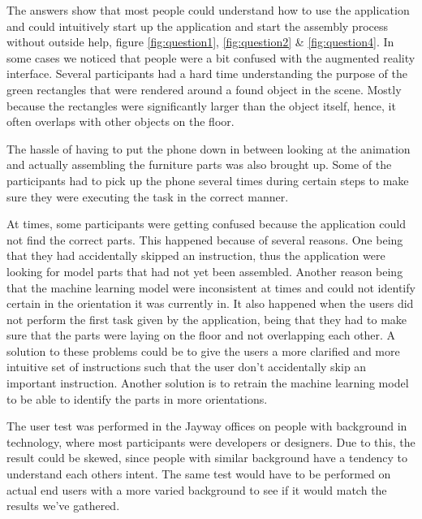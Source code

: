 The answers show that most people could understand how to use the application and 
could intuitively start up the application and start the assembly process without outside 
help, figure \ref{fig:question1}, \ref{fig:question2} \& \ref{fig:question4}. In some cases we noticed that people were a bit confused with the augmented reality 
interface. Several participants had a hard time understanding the purpose of the green 
rectangles that were rendered around a found object in the scene. Mostly because the 
rectangles were significantly larger than the object itself, hence, it often overlaps with 
other objects on the floor.

The hassle of having to put the phone down in between looking at the animation and 
actually assembling the furniture parts was also brought up. Some of the participants had 
to pick up the phone several times during certain steps to make sure they were executing 
the task in the correct manner.

At times, some participants were getting confused because the application could not find 
the correct parts. This happened because of several reasons. One being that they had 
accidentally skipped an instruction, thus the application were looking for model parts that 
had not yet been assembled. Another reason being that the machine learning model were 
inconsistent at times and could not identify certain in the orientation it was currently in. It 
also happened when the users did not perform 
the first task given by the application, being that they had to make sure that the parts were 
laying on the floor and not overlapping each other. A solution to these problems could be 
to give the users a more clarified and more intuitive set of instructions such that the user 
don't accidentally skip an important instruction. Another solution is to retrain the machine 
learning model to be able to identify the parts in more orientations. 

The user test was performed in the Jayway offices on people with background in 
technology, where most participants were developers or designers. Due to this, the result 
could be skewed, since people with similar background have a tendency to understand 
each others intent. The same test would have to be performed on actual end users with a 
more varied background to see if it would match the results we've gathered.
\newpage
